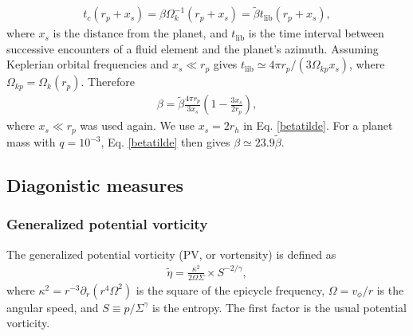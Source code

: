 \begin{align}
  t_c(r_p+x_s) = \beta\Omega_k^{-1}(r_p+x_s) = \tilde{\beta} t_{\mathrm{lib}}(r_p+x_s), 
\end{align}
where $x_s$ is the distance from the planet, and $t_\mathrm{lib}$ is
the time interval between successive encounters of a fluid element and
the planet's azimuth. Assuming Keplerian orbital frequencies and $x_s\ll r_p$
gives $t_\mathrm{lib}\simeq 4\pi r_p/(3\Omega_{kp} x_s)$, where
$\Omega_{kp} = \Omega_k(r_p)$. Therefore   
\begin{align}\label{betatilde}
  \beta = \tilde{\beta} \frac{4\pi r_p}{3x_s} \left(1  - \frac{3x_s}{2r_p}\right), 
\end{align}
where $x_s\ll r_p$ was used again. We use $x_s = 2r_h$ in
Eq. \ref{betatilde}. For a planet mass with $q=10^{-3}$,
Eq. \ref{betatilde} then gives $\beta \simeq 23.9\tilde{\beta}$. 




\subsection{Diagonistic measures}

\subsubsection{Generalized potential vorticity}

The generalized potential vorticity (PV, or vortensity) is defined as
\begin{align}
  \tilde{\eta} = \frac{\kappa^2}{2\Omega\Sigma}\times S^{-2/\gamma}, 
\end{align}
where $\kappa^2 = r^{-3}\partial_r(r^4\Omega^2)$ is the square of the
epicycle frequency, $\Omega=v_\phi/r$ is the angular speed, and
$S\equiv p/\Sigma^\gamma$ is the entropy. The first factor is the
usual potential vorticity. 

